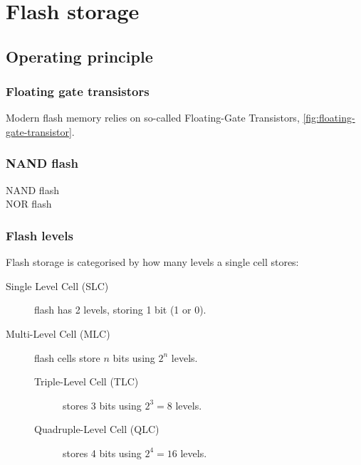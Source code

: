 \chapter{Flash storage}
\label{ch:flash}

\section{Operating principle}

\subsection{Floating gate transistors}

Modern flash memory relies on so-called Floating-Gate Transistors, \autoref{fig:floating-gate-transistor}.


\subsection{NAND flash}

\begin{description}
\item[NAND flash]
\item[NOR flash]
\end{description}



\subsection{Flash levels}

Flash storage is categorised by how many levels a single cell stores: 

\begin{description}
\item[Single Level Cell (SLC)] flash has 2 levels, storing 1 bit (1 or 0).
\item[Multi-Level Cell (MLC)] flash cells store $n$ bits using $2^n$ levels.
  \begin{description}
  \item[Triple-Level Cell (TLC)] stores 3 bits using $2^3=8$ levels.
  \item[Quadruple-Level Cell (QLC)] stores 4 bits using $2^4=16$ levels.
  \end{description}
\end{description}

